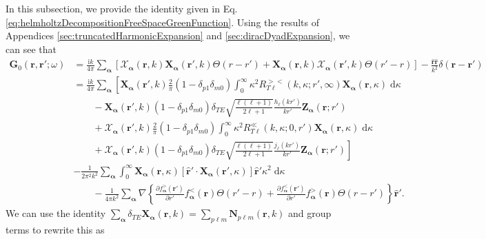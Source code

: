 \documentclass{article}
\begin{document}
In this subsection, we provide the identity given in Eq. \eqref{eq:helmholtzDecompositionFreeSpaceGreenFunction}. Using the results of Appendices \ref{sec:truncatedHarmonicExpansion} and \ref{sec:diracDyadExpansion}, we can see that
\begin{equation}
\begin{split}
\mathbf{G}_0(\mathbf{r},\mathbf{r}';\omega) &= \frac{\mathrm{i}k}{4\pi}\sum_{\bm{\alpha}}\left[\bm{\mathcal{X}}_{\bm{\alpha}}(\mathbf{r},k)\mathbf{X}_{\bm{\alpha}}(\mathbf{r}',k)\Theta(r - r') + \mathbf{X}_{\bm{\alpha}}(\mathbf{r},k) \bm{\mathcal{X}}_{\bm{\alpha}}(\mathbf{r}',k)\Theta(r' - r)\right] - \frac{\hat{\mathbf{r}}\hat{\mathbf{r}}}{k^2}\delta(\mathbf{r} - \mathbf{r}')\\[1.0em]
&= \frac{\mathrm{i}k}{4\pi}\sum_{\bm{\alpha}}\left[\mathbf{X}_{\bm{\alpha}}(\mathbf{r}',k)\frac{2}{\pi}(1 - \delta_{p1}\delta_{m0})\int_0^\infty\kappa^2R_{T\ell}^{><}(k,\kappa;r',\infty)\mathbf{X}_{\bm{\alpha}}(\mathbf{r},\kappa)\;\mathrm{d}\kappa\right.\\
&\qquad- \mathbf{X}_{\bm{\alpha}}(\mathbf{r}',k)(1 - \delta_{p1}\delta_{m0})\delta_{TE}\sqrt{\frac{\ell(\ell + 1)}{2\ell + 1}}\frac{h_\ell(kr')}{kr'}\mathbf{Z}_{\bm{\alpha}}(\mathbf{r};r')\\
&\qquad+ \bm{\mathcal{X}}_{\bm{\alpha}}(\mathbf{r}',k)\frac{2}{\pi}(1 - \delta_{p1}\delta_{m0})\int_0^\infty\kappa^2R_{T\ell}^\ll(k,\kappa;0,r')\mathbf{X}_{\bm{\alpha}}(\mathbf{r},\kappa)\;\mathrm{d}\kappa\\
&\qquad+\left.\bm{\mathcal{X}}_{\bm{\alpha}}(\mathbf{r}',k)(1 - \delta_{p1}\delta_{m0})\delta_{TE}\sqrt{\frac{\ell(\ell + 1)}{2\ell + 1}}\frac{j_\ell(kr')}{kr'}\mathbf{Z}_{\bm{\alpha}}(\mathbf{r};r')\right]\\
&- \frac{1}{2\pi^2k^2}\sum_{\bm{\alpha}}\int_0^\infty\mathbf{X}_{\bm{\alpha}}(\mathbf{r},\kappa)\left[\hat{\mathbf{r}}'\cdot\mathbf{X}_{\bm{\alpha}}(\mathbf{r}',\kappa)\right]\hat{\mathbf{r}}'\kappa^2\;\mathrm{d}\kappa\\
&\qquad - \frac{1}{4\pi k^2}\sum_{\bm{\alpha}}\nabla\left\{\frac{\partial f_{\bm{\alpha}}^>(\mathbf{r}')}{\partial r'}f_{\bm{\alpha}}^<(\mathbf{r})\Theta(r' - r) + \frac{\partial f_{\bm{\alpha}}^<(\mathbf{r}')}{\partial r'}f_{\bm{\alpha}}^>(\mathbf{r})\Theta(r - r')\right\}\hat{\mathbf{r}}'.
\end{split}
\end{equation}
We can use the identity $\sum_{\bm{\alpha}}\delta_{TE}\mathbf{X}_{\bm{\alpha}}(\mathbf{r},k) = \sum_{p\ell m}\mathbf{N}_{p\ell m}(\mathbf{r},k)$ and group terms to rewrite this as
\end{document}
